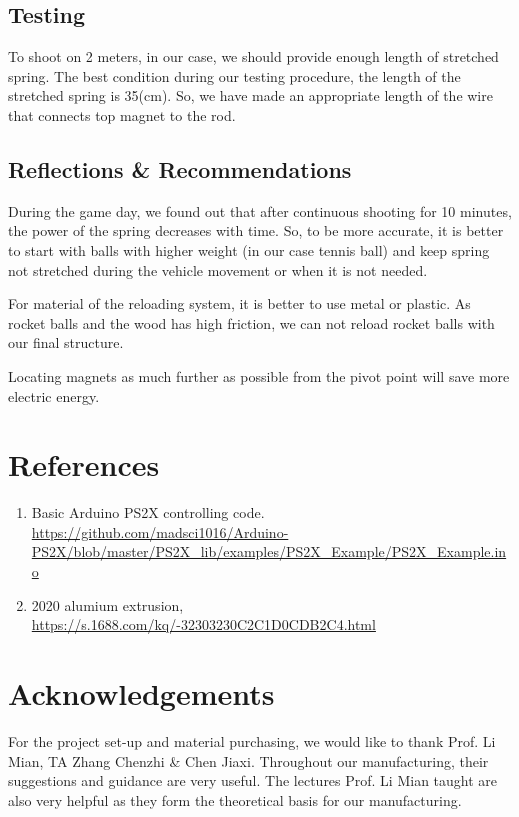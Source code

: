 \documentclass{article}
\begin{document}
\subsection{Testing}
To shoot on 2 meters, in our case, we should provide enough length of stretched spring. The best condition during our testing procedure, the length of the stretched  spring is 35(cm). So, we have made an appropriate length of the wire that connects top magnet to the rod. 

\subsection{Reflections \& Recommendations}
During the game day, we found out that after continuous shooting for 10 minutes, the power of the spring decreases with time. So, to be more accurate, it is better to start with balls with higher weight (in our case tennis ball) and keep spring not stretched during the vehicle movement or when it is not needed.
\par 
For material of the reloading system, it is better to use metal or plastic. As rocket balls and the wood has high friction, we can not reload rocket balls with our final structure.
\par 
Locating magnets as much further as possible from the pivot point will save more electric energy.
\section{References}
\begin{enumerate}
\item Basic Arduino PS2X controlling code. \url{https://github.com/madsci1016/Arduino-PS2X/blob/master/PS2X_lib/examples/PS2X_Example/PS2X_Example.ino}
\item 2020 alumium extrusion, \url{https://s.1688.com/kq/-32303230C2C1D0CDB2C4.html}
\end{enumerate}

\section{Acknowledgements}
\par For the project set-up and material purchasing, we would like to thank Prof. Li Mian, TA Zhang Chenzhi \& Chen Jiaxi. Throughout our manufacturing, their suggestions and guidance are very useful. The lectures Prof. Li Mian taught are also very helpful as they form the theoretical basis for our manufacturing.\\
\end{document}
